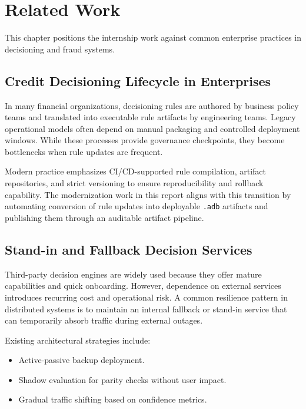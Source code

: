 \chapter{Related Work}

This chapter positions the internship work against common enterprise practices in decisioning and fraud systems.

\section{Credit Decisioning Lifecycle in Enterprises}

In many financial organizations, decisioning rules are authored by business policy teams and translated into executable rule artifacts by engineering teams. Legacy operational models often depend on manual packaging and controlled deployment windows. While these processes provide governance checkpoints, they become bottlenecks when rule updates are frequent.

Modern practice emphasizes CI/CD-supported rule compilation, artifact repositories, and strict versioning to ensure reproducibility and rollback capability. The modernization work in this report aligns with this transition by automating conversion of rule updates into deployable \texttt{.adb} artifacts and publishing them through an auditable artifact pipeline.

\section{Stand-in and Fallback Decision Services}

Third-party decision engines are widely used because they offer mature capabilities and quick onboarding. However, dependence on external services introduces recurring cost and operational risk. A common resilience pattern in distributed systems is to maintain an internal fallback or stand-in service that can temporarily absorb traffic during external outages.

Existing architectural strategies include:

\begin{itemize}
	\item Active-passive backup deployment.
	\item Shadow evaluation for parity checks without user impact.
	\item Gradual traffic shifting based on confidence metrics.
\end{itemize}

